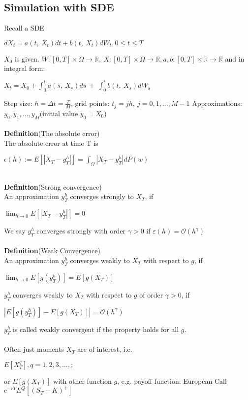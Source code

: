 \documentclass{article}
\begin{document}
\subsection{Simulation with SDE}
Recall a SDE 
\begin{center}
	$dX_{t}=a\left( t,\  X_{t}\right)  dt+b\left( t,\  X_{t}\right)  dW_{t},0\leqslant t\leqslant T$
\end{center}
$X_{0}$ is given.
$W:\left[ 0,T\right]  \times \Omega \rightarrow \mathbb{R} ,\  X:\left[ 0,T\right]  \times \Omega \rightarrow \mathbb{R} ,a, b:\left[ 0,T\right]  \times \mathbb{R} \rightarrow \mathbb{R}$
and in integral form:
\begin{center}
	$X_{t}=X_{0}+\int^{t}_{0} a\left( s,\  X_{s}\right)  ds\  +\  \int^{t}_{0} b\left( t,\  X_{s}\right)  dW_{s}$
\end{center}
Step size: $h=\Delta t=\frac{T}{M} $, grid points: $t_{j}=jh,\  j=0,1,...,M-1$
Approximations: $y_{0},y_{1},...,y_{M}$(initial value $y_{0}=X_{0}$)\\~\\
\textbf{Definition}(The absolute error)\\
The absolute error at time T is
\begin{center}
	$\epsilon(h):=E\left[\left|X_{T}-y_{T}^{h}\right|\right]=\int_{\Omega}\left|X_{T}-y_{T}^{h}\right| d P(w)$
\end{center}~\\
\textbf{Definition}(Strong convergence)\\
An approximation $y^{h}_{T}$ converges strongly to $X_T$, if
\begin{center}
	$\lim _{h \rightarrow 0} E\left[\left|X_{T}-y_{T}^{h}\right|\right]=0$
\end{center}
We say $y^{h}_{T}$ converges strongly with order $\gamma >0$ if $\varepsilon \left( h\right)  =\mathcal{O} \left( h^{\gamma }\right) $\\~\\
\textbf{Definition}(Weak Convergence)\\
An approximation $y^{h}_{T}$ converges weakly to $X_T$ with respect to $g$, if
\begin{center}
	$\lim _{h \rightarrow 0} E\left[g\left(y_{T}^{h}\right)\right]=E\left[g\left(X_{T}\right)\right]$
\end{center}
$y^{h}_{T}$ converges weakly to $X_T$ with respect to $g$ of order $\gamma>0$, if
\begin{center}
	$\left|E\left[g\left(y_{T}^{h}\right)\right]-E\left[g\left(X_{T}\right)\right]\right|=\mathcal{O}\left(h^{\gamma}\right)$
\end{center}
$y^{h}_{T}$ is called weakly convergent if the property holds for all $g$.\\~\\
Often just moments $X_T$ are of interest, i.e.
\begin{center}
	$E\left[ X^{q}_{T}\right]  ,q=1,2,3,...,;$
\end{center}
or $E\left[ g\left( X_{T}\right)  \right]$ with other function $g$, e.g. payoff function: European Call $e^{-rT}E^{Q}\left[ \left( S_{T}-K\right)^{+}  \right]$
\end{document}
